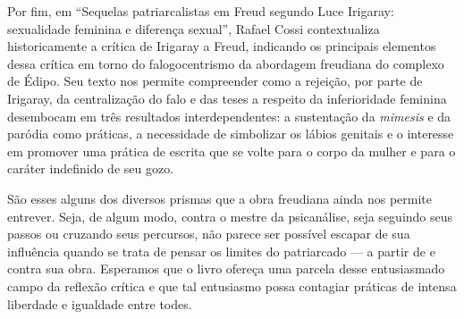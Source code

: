 Por fim, em ``Sequelas patriarcalistas em Freud segundo Luce Irigaray:
sexualidade feminina e diferença sexual'', Rafael Cossi contextualiza
historicamente a crítica de Irigaray a Freud, indicando os principais
elementos dessa crítica em torno do falogocentrismo da abordagem
freudiana do complexo de Édipo. Seu texto nos permite compreender como a
rejeição, por parte de Irigaray, da centralização do falo e das teses a
respeito da inferioridade feminina desembocam em três resultados
interdependentes: a sustentação da \emph{mimesis} e da paródia como
práticas, a necessidade de simbolizar os lábios genitais e o interesse
em promover uma prática de escrita que se volte para o corpo da mulher e
para o caráter indefinido de seu gozo.

São esses alguns dos diversos prismas que a obra freudiana ainda nos
permite entrever. Seja, de algum modo, contra o mestre da psicanálise, seja seguindo seus passos ou cruzando seus percursos, não parece ser possível escapar de sua influência quando se trata de pensar os limites do patriarcado --- a partir de e contra sua obra.
Esperamos que o livro ofereça uma parcela desse
entusiasmado campo da reflexão crítica e que tal entusiasmo possa
contagiar práticas de intensa liberdade e igualdade entre todes.
